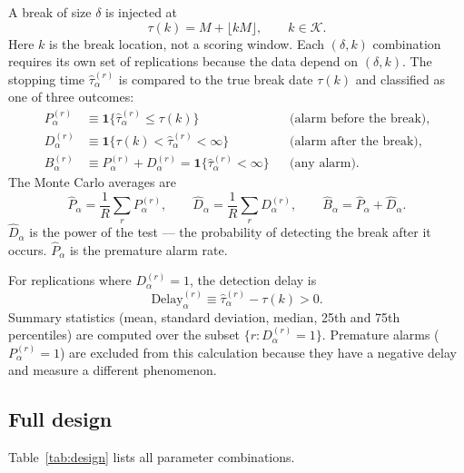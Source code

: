 \documentclass[12pt]{article}
\begin{document}
A break of size $\delta$ is injected at
\begin{equation}
\tau(k) = M + \lfloor kM \rfloor, \qquad k\in\mathcal{K}.
\label{eq:tauk}
\end{equation}
Here $k$ is the break location, not a scoring window. Each $(\delta,k)$
combination requires its own set of replications because the data depend on
$(\delta,k)$. The stopping time $\hat\tau_\alpha^{(r)}$ is compared to the
true break date $\tau(k)$ and classified as one of three outcomes:
\begin{align}
P_\alpha^{(r)} &\equiv \mathbf{1}\{\hat\tau_\alpha^{(r)} \le \tau(k)\}
  && \text{(alarm before the break)}, \label{eq:premature} \\
D_\alpha^{(r)} &\equiv \mathbf{1}\{\tau(k) < \hat\tau_\alpha^{(r)} < \infty\}
  && \text{(alarm after the break)}, \label{eq:detect} \\
B_\alpha^{(r)} &\equiv P_\alpha^{(r)} + D_\alpha^{(r)}
  = \mathbf{1}\{\hat\tau_\alpha^{(r)} < \infty\}
  && \text{(any alarm).} \label{eq:anyalarm}
\end{align}
The Monte Carlo averages are
\begin{equation}
\widehat{P}_\alpha = \frac{1}{R}\sum_r P_\alpha^{(r)}, \qquad
\widehat{D}_\alpha = \frac{1}{R}\sum_r D_\alpha^{(r)}, \qquad
\widehat{B}_\alpha = \widehat{P}_\alpha + \widehat{D}_\alpha.
\label{eq:PDhats}
\end{equation}
$\widehat{D}_\alpha$ is the power of the test --- the probability of
detecting the break after it occurs. $\widehat{P}_\alpha$ is the
premature alarm rate.

For replications where $D_\alpha^{(r)}=1$, the detection delay is
\begin{equation}
\mathrm{Delay}_\alpha^{(r)} \equiv \hat\tau_\alpha^{(r)} - \tau(k) > 0.
\label{eq:delay}
\end{equation}
Summary statistics (mean, standard deviation, median, 25th and 75th
percentiles) are computed over the subset $\{r: D_\alpha^{(r)}=1\}$.
Premature alarms ($P_\alpha^{(r)}=1$) are excluded from this calculation
because they have a negative delay and measure a different phenomenon.

\subsection{Full design}

Table~\ref{tab:design} lists all parameter combinations.
\end{document}
